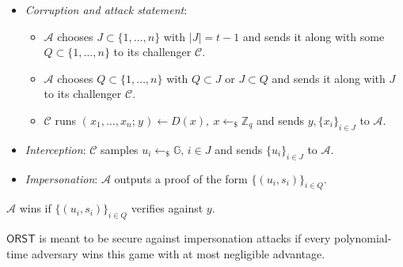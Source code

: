 \documentclass[psamsfonts, reqno]{amsart}
\theoremstyle{definition}
\theoremstyle{remark}
\numberwithin{equation}{section}
\begin{document}
\begin{itemize}[label=$\bullet$,leftmargin=20pt,rightmargin=0pt]
	\vspace{0pt}
	\item
		\textit{Corruption and attack statement}:
			\begin{itemize}[
				label=$\circ$,leftmargin=17pt,rightmargin=21pt
			]
			\vspace{0pt}
			\item $\mathcal{A}$ chooses $J \subset \{1, \dots, n\}$
				with $|J| = t-1$ and sends it along with some
				$Q \subset \{1, \dots, n\}$
				to its challenger $\mathcal{C}$.
				\vspace{3pt}
			\item $\mathcal{A}$ chooses $Q \subset \{1, \dots, n\}$
				with $Q \subset J$  or $J \subset Q$ and
				sends it along with $J$ to its challenger
				$\mathcal{C}$.
				\vspace{3pt}
			\item $\mathcal{C}$ runs
				$(\hspace{1pt}x_1, \dots, x_n;\hspace{1pt} y\hspace{1pt})
				\leftarrow D(x), \ x \leftarrow_\$ \mathbb{Z}_q$
				and sends $y, \{x_i\}_{i \in J}$
				to $\mathcal{A}$.
			\vspace{0pt}
			\end{itemize}
	\item
		\textit{Interception}:
		$\mathcal{C}$ samples
		$u_i \leftarrow_\$ \mathbb{G},\hspace{2pt} i \in J$
		and sends $\{u_i\}_{i \in J}$
		to $\mathcal{A}$.\vspace{3pt}
	\item \textit{Impersonation}:
		$\mathcal{A}$ outputs a proof of the form
		$\{(u_i, s_i)\}_{i \in Q}$.
\end{itemize}
\hspace*{5pt}%
\begin{minipage}{\dimexpr\textwidth-\parindent\relax}%
\hspace{3pt}
$\mathcal{A}$ wins if
$\{(u_i, s_i)\}_{i \in Q}$ verifies against $y$.
\vspace{5pt}
\end{minipage}%

\noindent
$\mathsf{ORST}$ is meant to be
secure against impersonation attacks
if every polynomial-time adversary wins this game
with at most negligible advantage.
\end{document}
